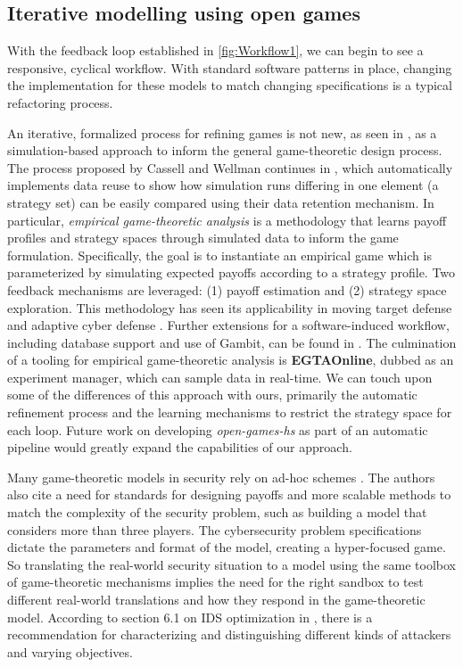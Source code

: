 \documentclass[11pt,titlepage,dvipsnames,table,xcdraw,english]{article}
\begin{document}
\subsection{Iterative modelling using open games}
\label{designPatterns:Iterative}
With the feedback loop established in \ref{fig:Workflow1}, we can begin to see a responsive, cyclical workflow. With standard software patterns in place, changing the implementation for these models to match changing specifications is a typical refactoring process. 

An iterative, formalized process for refining games is not new, as seen in \cite{wellman2006methods}, as a simulation-based approach to inform the general game-theoretic design process. The process proposed by Cassell and Wellman continues in \cite{EGTAOnline}, which automatically implements data reuse to show how simulation runs differing in one element (a strategy set) can be easily compared using their data retention mechanism. In particular, \textit{empirical game-theoretic analysis} is a methodology that learns payoff profiles and strategy spaces through simulated data to inform the game formulation. Specifically, the goal is to instantiate an empirical game which is parameterized by simulating expected payoffs according to a strategy profile. Two feedback mechanisms are leveraged: (1) payoff estimation and (2) strategy space exploration.  This methodology has seen its applicability in moving target defense \cite{Wellman2015} and adaptive cyber defense \cite{Wellman2019}. Further extensions for a software-induced workflow, including database support and use of Gambit, can be found in \cite{EGTAOnline}. The culmination of a tooling for empirical game-theoretic analysis is \textbf{EGTAOnline}, dubbed as an experiment manager, which can sample data in real-time. We can touch upon some of the differences of this approach with ours, primarily the automatic refinement process and the learning mechanisms to restrict the strategy space for each loop. Future work on developing \textit{open-games-hs} as part of an automatic pipeline would greatly expand the capabilities of our approach.

Many game-theoretic models in security rely on ad-hoc schemes \cite{Liang2013}. The authors also cite a need for standards for designing payoffs and more scalable methods to match the complexity of the security problem, such as building a model that considers more than three players. The cybersecurity problem specifications dictate the parameters and format of the model, creating a hyper-focused game. So translating the real-world security situation to a model using the same toolbox of game-theoretic mechanisms implies the need for the right sandbox to test different real-world translations and how they respond in the game-theoretic model. According to section 6.1 on IDS optimization in \cite{Collins2025}, there is a recommendation for characterizing and distinguishing different kinds of attackers and varying objectives.  
\end{document}
